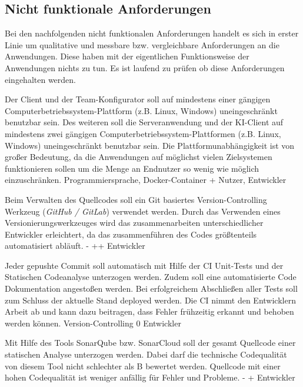 \subsection{Nicht funktionale Anforderungen}

Bei den nachfolgenden nicht funktionalen Anforderungen handelt es sich in erster Linie um qualitative und messbare bzw. vergleichbare Anforderungen an die Anwendungen. Diese haben mit der eigentlichen Funktionsweise der Anwendungen nichts zu tun. Es ist laufend zu prüfen ob diese Anforderungen eingehalten werden.

        {Der Client und der Team-Konfigurator soll auf mindestens einer gängigen Computerbetriebssystem-Plattform (z.B. Linux, Windows) uneingeschränkt benutzbar sein. Des weiteren soll die Serveranwendung und der KI-Client auf mindestens zwei gängigen Computerbetriebssystem-Plattformen (z.B. Linux, Windows) uneingeschränkt benutzbar sein.}
        {Die Plattformunabhängigkeit ist von großer Bedeutung, da die Anwendungen auf möglichst vielen Zielsystemen funktionieren sollen um die Menge an Endnutzer so wenig wie möglich einzuschränken.}
        {Programmiersprache, Docker-Container}
        {+}
        {Nutzer, Entwickler}

        {Beim Verwalten des Quellcodes soll ein Git basiertes Version-Controlling Werkzeug (\textit{GitHub / GitLab}) verwendet werden.}
        {Durch das Verwenden eines Versionierungswerkzeuges wird das zusammenarbeiten unterschiedlicher Entwickler erleichtert, da das zusammenführen des Codes größtenteils automatisiert abläuft.}
        {-}
        {++}
        {Entwickler}

        {Jeder gepushte Commit soll automatisch mit Hilfe der CI Unit-Tests und der Statischen Codeanalyse unterzogen werden. Zudem soll eine automatisierte Code Dokumentation angestoßen werden. Bei erfolgreichem Abschließen aller Tests soll zum Schluss der aktuelle Stand deployed werden.}
        {Die CI nimmt den Entwicklern Arbeit ab und kann dazu beitragen, dass Fehler frühzeitig erkannt und behoben werden können.}
        {Version-Controlling}
        {0}
        {Entwickler}

        {Mit Hilfe des Tools \glqq{}SonarQube\grqq{} bzw. \glqq{}SonarCloud\grqq{} soll der gesamt Quellcode einer statischen Analyse unterzogen werden. Dabei darf die technische Codequalität von diesem Tool nicht schlechter als \glqq{}B\grqq{} bewertet werden.}
        {Quellcode mit einer hohen Codequalität ist weniger anfällig für Fehler und Probleme.}
        {-}
        {+}
        {Entwickler}

